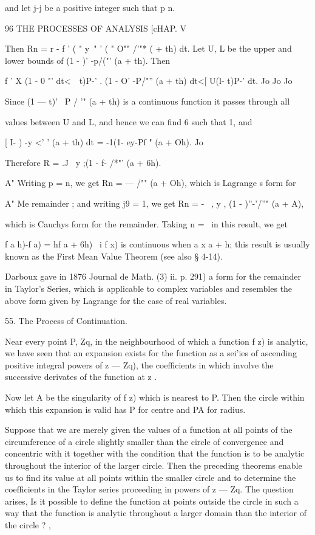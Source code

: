 {{and let j-j be a positive integer such that p   n. 



96 THE PROCESSES OF ANALYSIS [cHAP. V 

Then Rn = r - f ' (  "  y~" ' (  " O"" /'"* (  + th) dt. 
Let U, L be the upper and lower bounds of (1 -  )' -p/("' (a + th). 
Then 

f ' X (1 - 0 "' dt<\ \   t)P-' . (1 - O' -P/"'' (a + th) dt<[ U(l- t)P-' dt. 
Jo Jo Jo 

Since (1 — t)' ~P / '"   (a + th) is a continuous function it passes through all 

values between U and L, and hence we can find 6 such that     1, and 

[  I-  ) -y <' ' (a + th) dt = -1(1- ey-Pf "  (a + Oh). 
Jo 

Therefore R  = .J \ y ;(1 -  f- /*"' (a + 6h). 

A" 
Writing p = n, we get Rn = — /"" (a + Oh), which is Lagrange s form for 

A" 
Me remainder ; and writing j9 = 1, we get Rn = - \  , y , (1 -  )''-'/''" (a +  A), 

which is Cauchys form for the remainder. 
Taking n = \ in this result, we get 

f a h)-f a) = hf a + 6h) 
\ i f  x) is continuous when a x a + h; this result is usually known as the First 
Mean Value Theorem (see also § 4-14). 

Darboux gave in 1876  Journal de Math. (3) ii. p. 291) a form for the remainder in 
Taylor's Series, which is applicable to complex variables and resembles the above form 
given by Lagrange for the case of real variables. 

55. The Process of Continuation. 

Near every point P, Zq, in the neighbourhood of which a function f z) is 
analytic, we have seen that an expansion exists for the function as a sei'ies 
of ascending positive integral powers of  z — Zq), the coefficients in which 
involve the successive derivates of the function at z . 

Now let A be the singularity of f z) which is nearest to P. Then the 
circle within which this expansion is valid has P for centre and PA for 
radius. 

Suppose that we are merely given the values of a function at all points of 
the circumference of a circle slightly smaller than the circle of convergence 
and concentric with it together with the condition that the function is to be 
analytic throughout the interior of the larger circle. Then the preceding 
theorems enable us to find its value at all points within the smaller circle 
and to determine the coefficients in the Taylor series proceeding in powers 
of z — Zq. The question arises, Is it possible to define the function at points 
outside the circle in such a way that the function is analytic throughout 
a larger domain than the interior of the circle ? , 



}}
